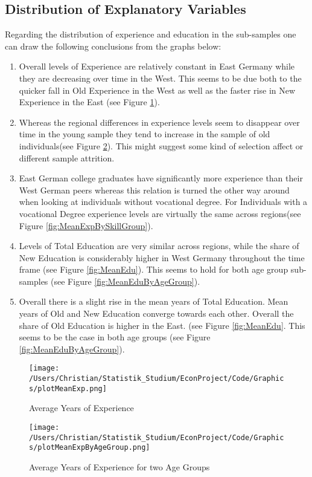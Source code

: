 \documentclass{article}
\begin{document}
\FloatBarrier
\subsection{Distribution of Explanatory Variables}
Regarding the distribution of experience and education in the sub-samples one can draw the following conclusions from the graphs below:
\begin{enumerate}
	\item Overall levels of Experience are relatively constant in East Germany while they are decreasing over time in the West. This seems to be due both to the quicker fall in Old Experience in the West as well as the faster rise in New Experience in the East (see Figure \ref{fig:MeanExp}).
	\item Whereas the regional differences in experience levels seem to disappear over time in the young sample they tend to increase in the sample of old individuals(see Figure \ref{fig:MeanExpByAgeGroup}). This might suggest some kind of selection affect or different sample attrition.
	\item East German college graduates have significantly more experience than their West German peers whereas this relation is turned the other way around when looking at individuals without vocational degree. For Individuals with a vocational Degree experience levels are virtually the same across regions(see Figure \ref{fig:MeanExpBySkillGroup}).
	\item Levels of Total Education are very similar across regions, while the share of New Education is considerably higher in West Germany throughout the time frame (see Figure \ref{fig:MeanEdu}). This seems to hold for both age group sub-samples (see Figure \ref{fig:MeanEduByAgeGroup}).
	\item Overall there is a slight rise in the mean years of Total Education. Mean years of Old and New Education converge towards each other. Overall the share of Old Education is higher in the East. (see Figure \ref{fig:MeanEdu}. This seems to be the case in both age groups (see Figure \ref{fig:MeanEduByAgeGroup}).
\end{enumerate}
\begin{figure}[!h]
    \centering
    \texttt{[image: /Users/Christian/Statistik\_Studium/EconProject/Code/Graphics/plotMeanExp.png]}
    \caption{Average Years of Experience}
    \label{fig:MeanExp}
\end{figure}

\begin{figure}[!h]
    \centering
    \texttt{[image: /Users/Christian/Statistik\_Studium/EconProject/Code/Graphics/plotMeanExpByAgeGroup.png]}
    \caption{Average Years of Experience for two Age Groups}
    \label{fig:MeanExpByAgeGroup}
\end{figure}
\end{document}
